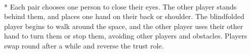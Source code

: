 \begin{minipage}{\textwidth}
\\*
Each pair chooses one person to close their eyes.  The other player stands behind them, and places one hand on their back or shoulder.  The blindfolded player begins to walk around the space, and the other player uses their other hand to turn them or stop them, avoiding other players and obstacles.  Players swap round after a while and reverse the trust role.
\end{minipage}    \vfill
